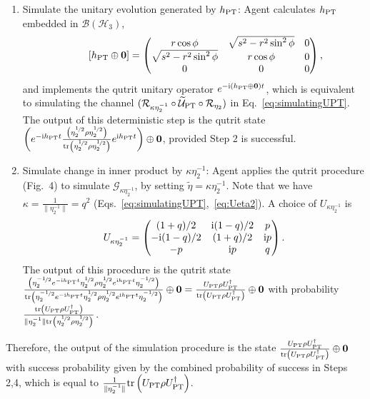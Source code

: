 \documentclass[amsmath,amssymb,aps,pra,superscriptaddress,twocolumn]{revtex4-2}
\begin{document}
\begin{appendix}
\begin{enumerate}
\item Simulate the unitary evolution generated by $h_{\rm PT}$:
Agent calculates $h_{\rm PT}$ embedded in $\mathcal{B}(\mathscr{H}_3)$,
\begin{equation}
    \qquad\; [h_{\rm PT} \oplus \bm{0}] = \begin{pmatrix}    
    r\cos \phi & \sqrt{s^2 - r^2\sin^2\phi} & 0\\
    \sqrt{s^2 - r^2\sin^2\phi} & r\cos \phi & 0\\
    0 & 0 & 0\end{pmatrix},
\end{equation}
and implements the qutrit unitary operator $e^{-{\rm i}(h_{\rm PT}\oplus \bm{0})t}$,
which is equivalent to simulating the channel $
(\mathcal{R}_{\kappa\eta^{-1}_2} \circ \widetilde{\mathcal{U}}_{\rm{PT}} \circ \mathcal{R}_{\eta_2})$
in Eq.~\eqref{eq:simulatingUPT}. 
The output of this deterministic step is the qutrit state $\left(e^{-{\rm i}h_{\rm PT}t} \frac{\left(\eta_2^{\nicefrac{1}{2}}\rho\eta_2^{\nicefrac{1}{2}}\right)}
{{\rm tr}\left(\eta_2^{\nicefrac{1}{2}}\rho\eta_2^{\nicefrac{1}{2}}\right)}e^{{\rm i}h_{\rm PT}t}\right)\oplus\bm{0} $, 
provided Step 2 is successful.
\item Simulate change in inner product by $\kappa\eta_2^{-1}$:
Agent applies the qutrit procedure (Fig.~4)
to simulate $\mathcal{G}_{\kappa\eta_2^{-1}}$,
by setting $\tilde{\eta} = \kappa\eta^{-1}_2$.
Note that we have $\kappa = \frac{1}{\|\eta_2^{-1}\|} = q^2$ (Eqs.~\eqref{eq:simulatingUPT},~\eqref{eq:Ueta2}).
A choice of $U_{\kappa\eta^{-1}_2} $ is
\begin{equation}
    U_{\kappa{\eta}_2^{-1}} = \begin{pmatrix}
    (1+q)/2 & {\rm i}(1-q)/2 & p \\
    -{\rm i}(1-q)/2 & (1+q)/2 & {\rm i}p \\
    -p & {\rm i}p & q
    \end{pmatrix}.
\end{equation}
The output of this procedure is the qutrit state 
$\frac{\left(\eta^{\nicefrac{-1}{2}}_2e^{-{\rm i}h_{\rm PT}t}\eta_2^{\nicefrac{1}{2}}\rho\eta_2^{\nicefrac{1}{2}}e^{{\rm i}h_{\rm PT}t}\eta^{\nicefrac{-1}{2}}_2\right)}
{{\rm tr}\left(\eta^{\nicefrac{-1}{2}}_2e^{-{\rm i}h_{\rm PT}t}\eta_2^{\nicefrac{1}{2}}\rho\eta_2^{\nicefrac{1}{2}}e^{{\rm i}h_{\rm PT}t}\eta^{\nicefrac{-1}{2}}_2\right)}\oplus\bm{0}  = \frac{U_{\rm PT} \rho U_{\rm PT}^\dagger}{{\rm tr}\left( U_{\rm PT} \rho U_{\rm PT}^\dagger\right)} \oplus \bm{0}$ 
with probability  $\frac{{\rm tr}\left( U_{\rm PT} \rho U_{\rm PT}^\dagger\right)}{\|\eta_2^{-1}\|{\rm tr} \left(\eta_2^{\nicefrac{1}{2}}\rho\eta_2^{\nicefrac{1}{2}}\right)}$.
\end{enumerate}
Therefore, the output of the simulation procedure is the state 
$\frac{U_{\rm PT} \rho U_{\rm PT}^\dagger}{{\rm tr}\left( U_{\rm PT} \rho U_{\rm PT}^\dagger\right)} \oplus \bm{0}$
with success probability given by the combined probability of success in Steps 2,4, which is equal to
$\frac{1}{\|\eta_2^{-1}\|}{{\rm tr}\left( U_{\rm PT} \rho U_{\rm PT}^\dagger\right)}$.




\end{appendix}
\end{document}
